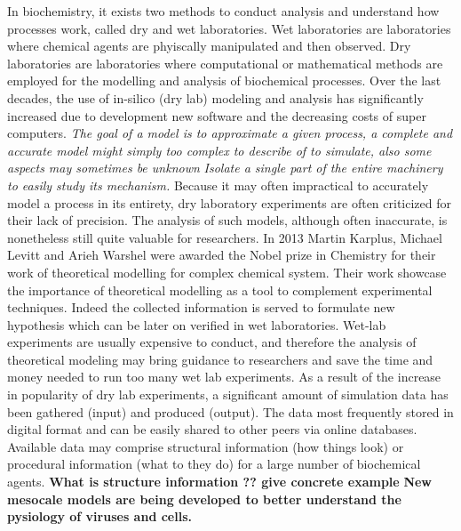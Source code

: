 %
%

In biochemistry, it exists two methods to conduct analysis and understand how processes work, called dry and wet laboratories.
Wet laboratories are laboratories where chemical agents are phyiscally manipulated and then observed.
Dry laboratories are laboratories where computational or mathematical methods are employed for the modelling and analysis of biochemical processes. 
Over the last decades, the use of in-silico (dry lab) modeling and analysis has significantly increased due to development new software and the decreasing costs of super computers.
\textit{The goal of a model is to approximate a given process, a complete and accurate model might simply too complex to describe of to simulate, also some aspects may sometimes be unknown}
\textit{Isolate a single part of the entire machinery to easily study its mechanism.}
Because it may often impractical to accurately model a process in its entirety, dry laboratory experiments are often criticized for their lack of precision.
The analysis of such models, although often inaccurate, is nonetheless still quite valuable for researchers.
In 2013 Martin Karplus, Michael Levitt and Arieh Warshel were awarded the Nobel prize in Chemistry for their work of theoretical modelling for complex chemical system.
Their work showcase the importance of theoretical modelling as a tool to complement experimental techniques.
Indeed the collected information is served to formulate new hypothesis which can be later on verified in wet laboratories.
Wet-lab experiments are usually expensive to conduct, and therefore the analysis of theoretical modeling may bring guidance to researchers and save the time and money needed to run too many wet lab experiments.
As a result of the increase in popularity of dry lab experiments, a significant amount of simulation data has been gathered (input) and produced (output).
The data most frequently stored in digital format and can be easily shared to other peers via online databases.
Available data may comprise structural information (how things look) or procedural information (what to they do) for a large number of biochemical agents.
\textbf{What is structure information ?? give concrete example}
\textbf{New mesocale models are being developed to better understand the pysiology of viruses and cells.}
